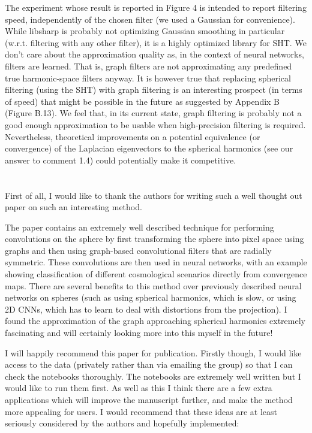 \documentclass[12pt,a4paper]{article}
\newcommand{\1}{\b{1}}              %
\newcommand{\0}{\b{0}}              %
\begin{document}
The experiment whose result is reported in Figure 4 is intended to report filtering speed, independently of the chosen filter (we used a Gaussian for convenience).
While libsharp is probably not optimizing Gaussian smoothing in particular (w.r.t. filtering with any other filter), it is a highly optimized library for SHT.
We don't care about the approximation quality as, in the context of neural networks, filters are learned.
That is, graph filters are not approximating any predefined true harmonic-space filters anyway.
It is however true that replacing spherical filtering (using the SHT) with graph filtering is an interesting prospect (in terms of speed) that might be possible in the future as suggested by Appendix B (Figure B.13).
We feel that, in its current state, graph filtering is probably not a good enough approximation to be usable when high-precision filtering is required.
Nevertheless, theoretical improvements on a potential equivalence (or convergence) of the Laplacian eigenvectors to the spherical harmonics (see our answer to comment 1.4) could potentially make it competitive.


\section{}
\label{sec:dataset}
\begin{mdframed}[style=comment]
First of all, I would like to thank the authors for writing such a well thought out paper on such an interesting method.

The paper contains an extremely well described technique for performing convolutions on the sphere by first transforming the sphere into pixel space using graphs and then using graph-based convolutional filters that are radially symmetric. These convolutions are then used in neural networks, with an example showing classification of different cosmological scenarios directly from convergence maps. There are several benefits to this method over previously described neural networks on spheres (such as using spherical harmonics, which is slow, or using 2D CNNs, which has to learn to deal with distortions from the projection). I found the approximation of the graph approaching spherical harmonics extremely fascinating and will certainly looking more into this myself in the future!

I will happily recommend this paper for publication. Firstly though, I would like access to the data (privately rather than via emailing the group) so that I can check the notebooks thoroughly. The notebooks are extremely well written but I would like to run them first. As well as this I think there are a few extra applications which will improve the manuscript further, and make the method more appealing for users. I would recommend that these ideas are at least seriously considered by the authors and hopefully implemented:
\end{mdframed}
\end{document}
